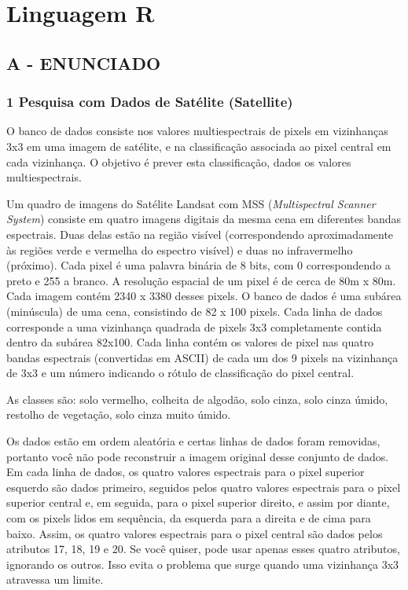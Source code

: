 \label{ap:ap03}
\chapter{Linguagem R}
\section*{\textbf{A - ENUNCIADO}}
\subsection*{\textbf{1 Pesquisa com Dados de Satélite (Satellite)}}



O banco de dados consiste nos valores multiespectrais de pixels em vizinhanças 3x3 em uma imagem de satélite, e na
classificação associada ao pixel central em cada vizinhança. O objetivo é prever esta classificação, dados os valores
multiespectrais.

Um quadro de imagens do Satélite Landsat com MSS (\textit{Multispectral Scanner System}) consiste em quatro imagens
digitais da mesma cena em diferentes bandas espectrais. Duas delas estão na região visível (correspondendo
aproximadamente às regiões verde e vermelha do espectro visível) e duas no infravermelho (próximo). Cada pixel é uma
palavra binária de 8 bits, com 0 correspondendo a preto e 255 a branco. A resolução espacial de um pixel é de cerca de
80m x 80m. Cada imagem contém 2340 x 3380 desses pixels. O banco de dados é uma subárea (minúscula) de uma cena,
consistindo de 82 x 100 pixels. Cada linha de dados corresponde a uma vizinhança quadrada de pixels 3x3 completamente
contida dentro da subárea 82x100. Cada linha contém os valores de pixel nas quatro bandas espectrais (convertidas em
ASCII) de cada um dos 9 pixels na vizinhança de 3x3 e um número indicando o rótulo de classificação do pixel central.

As classes são: solo vermelho, colheita de algodão, solo cinza, solo cinza úmido, restolho de vegetação, solo cinza
muito úmido.

Os dados estão em ordem aleatória e certas linhas de dados foram removidas, portanto você não pode reconstruir a imagem
original desse conjunto de dados. Em cada linha de dados, os quatro valores espectrais para o pixel superior esquerdo
são dados primeiro, seguidos pelos quatro valores espectrais para o pixel superior central e, em seguida, para o pixel
superior direito, e assim por diante, com os pixels lidos em sequência, da esquerda para a direita e de cima para
baixo. Assim, os quatro valores espectrais para o pixel central são dados pelos atributos 17, 18, 19 e 20. Se você
quiser, pode usar apenas esses quatro atributos, ignorando os outros. Isso evita o problema que surge quando uma
vizinhança 3x3 atravessa um limite.

